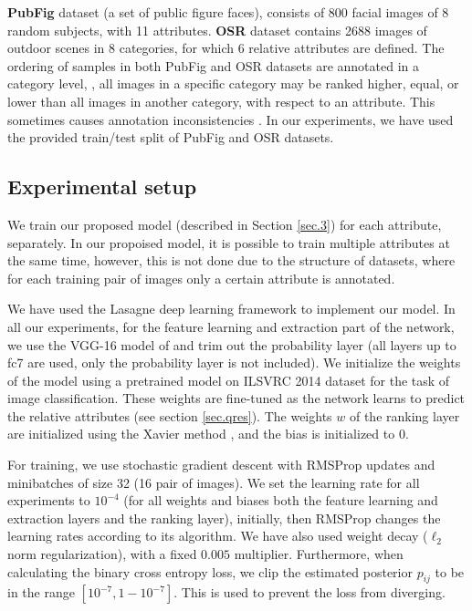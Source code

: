 \textbf{PubFig} \cite{parikh2011} dataset (a set of public figure faces), consists of 800 facial images of 8 random subjects, with 11 attributes.
\textbf{OSR} \cite{parikh2011} dataset contains 2688 images of outdoor scenes in 8 categories, for which 6 relative attributes are defined.
The ordering of samples in both PubFig and OSR datasets are annotated in a category level, \ie, all images in a specific category may be ranked higher, equal, or lower than all images in another category, with respect to an attribute. This sometimes causes annotation inconsistencies \cite{Sandeep_2014_CVPR}.
In our experiments, we have used the provided train/test split of PubFig and OSR datasets.


\subsection{Experimental setup}
We train our proposed model (described in Section \ref{sec.3}) for each attribute, separately. In our propoised model, it is possible  to train multiple attributes at the same time, however, this is not done due to the structure of datasets, where for each training pair of images only a certain attribute is annotated.

We have used the Lasagne \cite{lasagne} deep learning framework to implement our model.
In all our experiments, for the feature learning and extraction part of the network,
we use the VGG-16 model of \cite{verydeep} and trim out the probability layer (all layers up to fc7 are used, only the probability layer is not included).
We initialize the weights of the model using a pretrained model on ILSVRC 2014 dataset \cite{ilsvrc2014} for the task of image classification. These weights are fine-tuned as the network learns to predict the relative attributes (see section \ref{sec.qres}). The weights $w$ of the ranking layer are initialized using the Xavier method \cite{glorot}, and the bias is initialized to 0.

For training, we use stochastic gradient descent with RMSProp \cite{Tieleman2012} updates and minibatches of size 32 (16 pair of images).
We set the learning rate for all experiments to $10^{-4}$ (for all weights and biases both the feature learning and extraction layers and the ranking layer), initially, then RMSProp changes the learning rates according to its algorithm. We have also used weight decay ($\ell_2$ norm regularization), with a fixed $0.005$ multiplier. Furthermore, when calculating the binary cross entropy loss, we clip the estimated posterior $p_{ij}$ to be in the range $[10^{-7}, 1 - 10^{-7}]$. This is used to prevent the loss from diverging.

